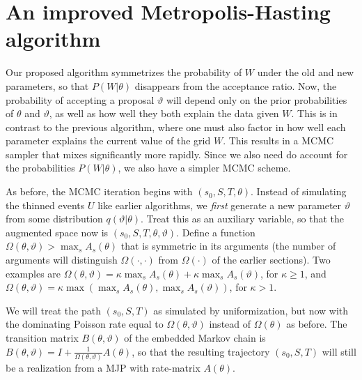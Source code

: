 
\section{An improved Metropolis-Hasting algorithm}
Our proposed algorithm symmetrizes the probability of $W$ under the old and new parameters, so that $P(W|\theta)$ disappears from the acceptance ratio. 
Now, the probability of accepting a proposal $\vartheta$ will depend only on the prior probabilities of $\theta$ and $\vartheta$, as well as how well they both explain the data given $W$.
This is in contrast to the previous algorithm, where one must also factor in how well each parameter explains the current value of the grid $W$.
This results in a MCMC sampler that mixes significantly more rapidly. 
Since we also need do account for the probabilities $P(W|\theta)$, we also have a simpler MCMC scheme.

As before, the MCMC iteration begins with $(s_0, S, T, \theta)$. 
Instead of simulating the thinned events $U$ like earlier algorithms, we {\em first} generate a new parameter $\vartheta$ from some distribution $q(\vartheta|\theta)$. 
Treat this as an auxiliary variable, so that the augmented space now is $(s_0,S, T, \theta,\vartheta)$. 
Define a function $\Omega(\theta,\vartheta) > \max_s A_s(\theta)$ that is symmetric in its arguments (the number of arguments will distinguish $\Omega(\cdot,\cdot)$ from $\Omega(\cdot)$ of the earlier sections).
Two examples are $\Omega(\theta,\vartheta) = \kappa \max_s A_s(\theta) + \kappa \max_s A_s(\vartheta)$, for $\kappa \ge 1$, and 
$\Omega(\theta,\vartheta) = \kappa \max\left(\max_s A_s(\theta), \max_s A_s(\vartheta)\right)$, for $\kappa > 1$.


We will treat the path $(s_0,S,T)$ as simulated by  uniformization, but now with the dominating Poisson rate equal to $\Omega(\theta,\vartheta)$  instead of $\Omega(\theta)$ as before. 
The transition matrix $B(\theta,\vartheta)$ of the embedded Markov chain is $B(\theta,\vartheta) = I + \frac{1}{\Omega(\theta,\vartheta)}A(\theta)$, so that the resulting trajectory $(s_0,S,T)$ will still be a realization from a MJP with rate-matrix $A(\theta)$.

